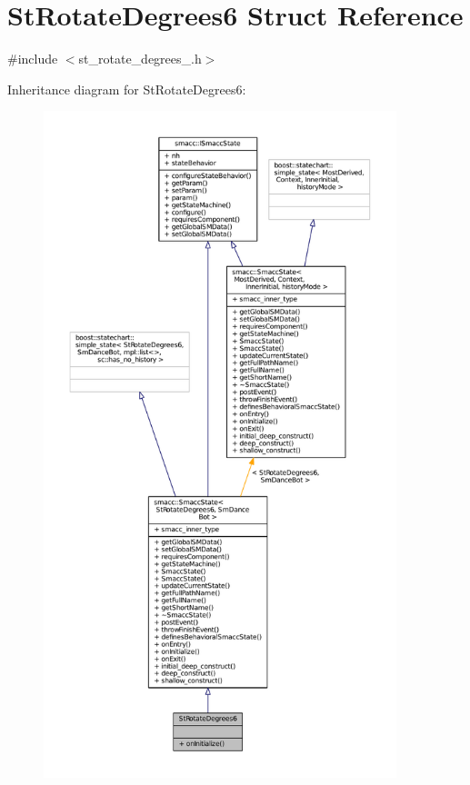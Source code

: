 \hypertarget{structStRotateDegrees6}{}\section{St\+Rotate\+Degrees6 Struct Reference}
\label{structStRotateDegrees6}


{\ttfamily \#include $<$st\+\_\+rotate\+\_\+degrees\+\_.\+h$>$}



Inheritance diagram for St\+Rotate\+Degrees6\+:
\nopagebreak
\begin{figure}[H]
\begin{center}
\leavevmode
\includegraphics[height=550pt]{structStRotateDegrees6__inherit__graph}
\end{center}
\end{figure}


